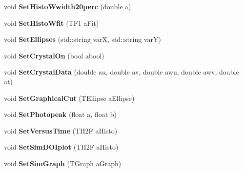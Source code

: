 \begin{DoxyCompactItemize}
\item 
\hypertarget{classCrystal_a12584eddc3ccaad6016281a856af663c}{void {\bfseries Set\+Histo\+Wwidth20perc} (double a)}\label{classCrystal_a12584eddc3ccaad6016281a856af663c}

\item 
\hypertarget{classCrystal_a1f1174ca63c2ce00334ef574b6bebcde}{void {\bfseries Set\+Histo\+Wfit} (T\+F1 a\+Fit)}\label{classCrystal_a1f1174ca63c2ce00334ef574b6bebcde}

\item 
\hypertarget{classCrystal_aedb6cd3684777ec64f2228674cd11ebb}{void {\bfseries Set\+Ellipses} (std\+::string var\+X, std\+::string var\+Y)}\label{classCrystal_aedb6cd3684777ec64f2228674cd11ebb}

\item 
\hypertarget{classCrystal_ad189d917526fc61f21d3b8565bd37fcb}{void {\bfseries Set\+Crystal\+On} (bool abool)}\label{classCrystal_ad189d917526fc61f21d3b8565bd37fcb}

\item 
\hypertarget{classCrystal_aa0c666d8f9ebc01e4a923a897894cf47}{void {\bfseries Set\+Crystal\+Data} (double au, double av, double awu, double awv, double at)}\label{classCrystal_aa0c666d8f9ebc01e4a923a897894cf47}

\item 
\hypertarget{classCrystal_a37815937e4978031c25f0036ea48fba9}{void {\bfseries Set\+Graphical\+Cut} (T\+Ellipse a\+Ellipse)}\label{classCrystal_a37815937e4978031c25f0036ea48fba9}

\item 
\hypertarget{classCrystal_a995cc2d54db8b9e584d5d8675d6cd80d}{void {\bfseries Set\+Photopeak} (float a, float b)}\label{classCrystal_a995cc2d54db8b9e584d5d8675d6cd80d}

\item 
\hypertarget{classCrystal_a6b9b3e253859a88d02122d61d0bb6dda}{void {\bfseries Set\+Versus\+Time} (T\+H2\+F a\+Histo)}\label{classCrystal_a6b9b3e253859a88d02122d61d0bb6dda}

\item 
\hypertarget{classCrystal_a5d364fe8e20a485906fa459f22bc4c0d}{void {\bfseries Set\+Sim\+D\+O\+Iplot} (T\+H2\+F a\+Histo)}\label{classCrystal_a5d364fe8e20a485906fa459f22bc4c0d}

\item 
\hypertarget{classCrystal_a7478983365206faec3b17ce6bf602505}{void {\bfseries Set\+Sim\+Graph} (T\+Graph a\+Graph)}\label{classCrystal_a7478983365206faec3b17ce6bf602505}


\end{DoxyCompactItemize}
